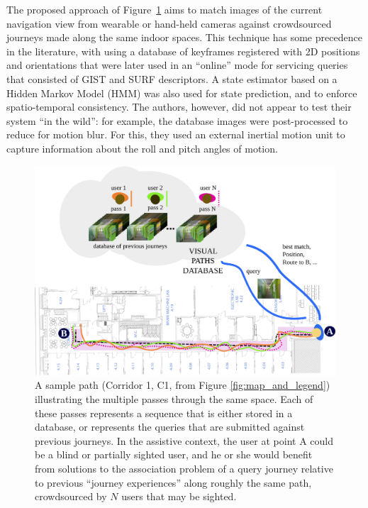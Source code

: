 The proposed approach of Figure~\ref{fig:visualpaths} aims to match images of the current navigation view from wearable or hand-held cameras against crowdsourced journeys made along the same indoor spaces. This technique has some precedence in the literature, with \citet{liu2010video} using a database of keyframes registered with 2D positions and orientations that were later used in an ``online'' mode for servicing queries that consisted of GIST and SURF descriptors. A state estimator based on a Hidden Markov Model (HMM) was also used for state prediction, and to enforce spatio-temporal consistency. The authors, however, did not appear to test their system ``in the wild'': for example, the database images were post-processed to reduce for motion blur. For this, they used an external inertial motion unit to capture information about the roll and pitch angles of motion. 
\begin{figure}[t]

\begin{center}
\includegraphics[width=\linewidth]{./gfx/Chapter04/corridor.pdf}
\caption{ A sample path (Corridor 1, C1, from Figure \ref{fig:map_and_legend}) illustrating the multiple passes through the same space. Each of these passes represents a sequence that is either stored in a database, or represents the queries that are submitted against previous journeys. In the assistive context, the user at point A could be a blind or partially sighted user, and he or she would benefit from solutions to the association problem of a query journey relative to previous ``journey experiences'' along roughly the same path, crowdsourced by $N$ users that may be sighted.}
\label{fig:visualpaths}
\end{center}
\end{figure}

